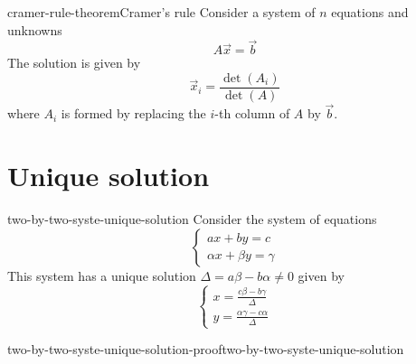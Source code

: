\documentclass[preview]{standalone}
\begin{document}
\begin{snippettheorem}{cramer-rule-theorem}{Cramer's rule}
    Consider a system of \(n\) equations and unknowns
    \[
        A\vec{x}=\vec{b}
    \]
    The solution is given by
    \[
        \vec{x}_i = \frac{\det(A_i)}{\det(A)}
    \]
    where \(A_i\) is formed by replacing the \(i\)-th column
    of \(A\) by \(\vec{b}\).
\end{snippettheorem}

\section{Unique solution}

\begin{snippetproposition}{two-by-two-syste-unique-solution}{}
    Consider the system of equations
    \[
        \begin{cases}
            ax + by = c \\
            \alpha x + \beta y = \gamma
        \end{cases}
    \]
    This system has a unique solution \ifandonlyif \(\Delta = a\beta - b\alpha \neq 0\)
    given by
    \[
        \begin{cases}
            x = \frac{c\beta - b\gamma}{\Delta} \\
            y = \frac{\alpha\gamma - c\alpha}{\Delta}
        \end{cases}
    \]
\end{snippetproposition}

\begin{snippetproof}{two-by-two-syste-unique-solution-proof}{two-by-two-syste-unique-solution}{}
\end{snippetproof}
\end{document}
